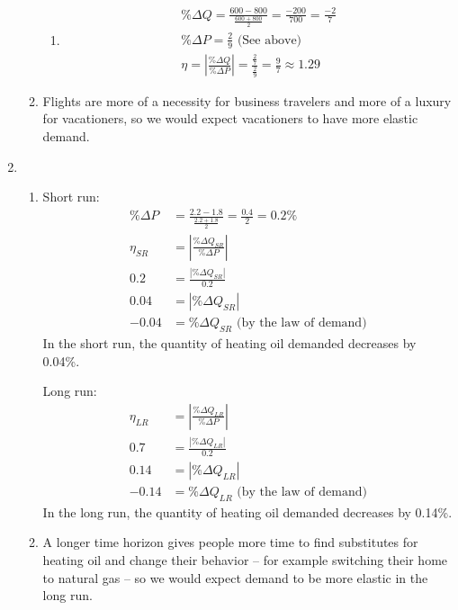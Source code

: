 \documentclass{article}
\begin{document}
\begin{enumerate}
\begin{enumerate}
\begin{enumerate}
		\item
		\begin{gather*}
		\% \Delta Q = \frac{600 - 800}{\frac{600 + 800}{2}} = \frac{-200}{700} = \frac{-2}{7} \\
		\% \Delta P = \frac{2}{9} \text{ (See above)} \\
		\eta = \left| \frac{\% \Delta Q}{\% \Delta P} \right| = \frac{\frac{2}{7}}{\frac{2}{9}} = \frac{9}{7} \approx 1.29
		\end{gather*}
		
		\end{enumerate}
		
	\item Flights are more of a necessity for business travelers and more of a luxury for vacationers, so we would expect vacationers to have more elastic demand.
	
	\end{enumerate}
	
\item

	\begin{enumerate}
	
	\item Short run:
	\begin{align*}
	\% \Delta P &= \frac{2.2 - 1.8}{\frac{2.2 + 1.8}{2}} = \frac{0.4}{2} = 0.2\% \\
	\eta_{SR} &= \left| \frac{\% \Delta Q_{SR}}{\% \Delta P} \right| \\
	0.2 &= \frac{| \% \Delta Q_{SR} |}{0.2} \\
	0.04 &= | \% \Delta Q_{SR} | \\
	-0.04 &= \% \Delta Q_{SR} \text{ (by the law of demand)}
	\end{align*}
	In the short run, the quantity of heating oil demanded decreases by 0.04\%.
	
	\vspace{5mm}
	
	Long run:
	\begin{align*}
	\eta_{LR} &= \left| \frac{\% \Delta Q_{LR}}{\% \Delta P} \right| \\
	0.7 &= \frac{| \% \Delta Q_{LR} |}{0.2} \\
	0.14 &= | \% \Delta Q_{LR} | \\
	-0.14 &= \% \Delta Q_{LR} \text{ (by the law of demand)}
	\end{align*}
	In the long run, the quantity of heating oil demanded decreases by 0.14\%.
	
	\item A longer time horizon gives people more time to find substitutes for heating oil and change their behavior -- for example switching their home to natural gas -- so we would expect demand to be more elastic in the long run.
	
	\end{enumerate}

\end{enumerate}
\end{document}
